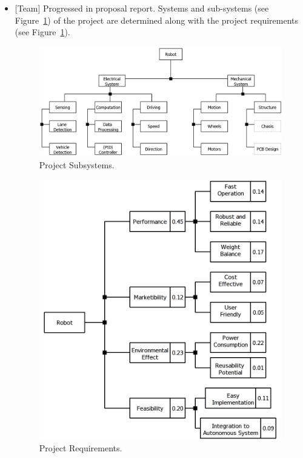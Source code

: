\documentclass[a4paper,12pt]{article}
\begin{document}
\begin{itemize}
\item {[Team]} Progressed in proposal report. Systems and sub-systems (see {Figure~\ref{fig:product-subsystems}}) of the project are determined along with the project requirements (see {Figure~\ref{fig:product-subsystems}}).
\begin{figure}[h]
	\centering
	\setlength{\unitlength}{\textwidth} 
	\includegraphics[width=\textwidth,height=\textheight,keepaspectratio]{product-subsystems}
	\caption{\label{fig:product-subsystems} Project Subsystems.}
\end{figure} 
\begin{figure}[h!]
	\centering
	\setlength{\unitlength}{\textwidth} 
	\includegraphics[width=.8\textwidth,height=\textheight,keepaspectratio]{project-systems}
	\caption{\label{fig:project-systems} Project Requirements.}
\end{figure} 



\end{itemize}
\end{document}
